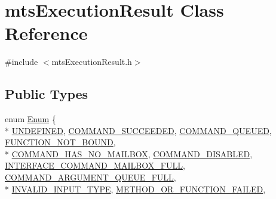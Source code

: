 \hypertarget{classmts_execution_result}{}\section{mts\+Execution\+Result Class Reference}
\label{classmts_execution_result}


{\ttfamily \#include $<$mts\+Execution\+Result.\+h$>$}

\subsection*{Public Types}
\begin{DoxyCompactItemize}
\item 
enum \hyperlink{classmts_execution_result_a10c4246c82ac99d88e5f716f79407b77}{Enum} \{ \\*
\hyperlink{classmts_execution_result_a10c4246c82ac99d88e5f716f79407b77a183bab612ecf53030df4ff80a3b8af9b}{U\+N\+D\+E\+F\+I\+N\+E\+D}, 
\hyperlink{classmts_execution_result_a10c4246c82ac99d88e5f716f79407b77aced9d158769e7ef0f2f17ef840a5e44a}{C\+O\+M\+M\+A\+N\+D\+\_\+\+S\+U\+C\+C\+E\+E\+D\+E\+D}, 
\hyperlink{classmts_execution_result_a10c4246c82ac99d88e5f716f79407b77a0e4d6149853440cbcaaa65391fe3dc69}{C\+O\+M\+M\+A\+N\+D\+\_\+\+Q\+U\+E\+U\+E\+D}, 
\hyperlink{classmts_execution_result_a10c4246c82ac99d88e5f716f79407b77aae1438c8267646451b13a5568996d4c4}{F\+U\+N\+C\+T\+I\+O\+N\+\_\+\+N\+O\+T\+\_\+\+B\+O\+U\+N\+D}, 
\\*
\hyperlink{classmts_execution_result_a10c4246c82ac99d88e5f716f79407b77a79a24cdbfea1eda7d4cf9553596d50f7}{C\+O\+M\+M\+A\+N\+D\+\_\+\+H\+A\+S\+\_\+\+N\+O\+\_\+\+M\+A\+I\+L\+B\+O\+X}, 
\hyperlink{classmts_execution_result_a10c4246c82ac99d88e5f716f79407b77ae2ff22d330a4e0a41cd55be7dda1fc43}{C\+O\+M\+M\+A\+N\+D\+\_\+\+D\+I\+S\+A\+B\+L\+E\+D}, 
\hyperlink{classmts_execution_result_a10c4246c82ac99d88e5f716f79407b77af7073c80d884d8ecaf97df0413f5478e}{I\+N\+T\+E\+R\+F\+A\+C\+E\+\_\+\+C\+O\+M\+M\+A\+N\+D\+\_\+\+M\+A\+I\+L\+B\+O\+X\+\_\+\+F\+U\+L\+L}, 
\hyperlink{classmts_execution_result_a10c4246c82ac99d88e5f716f79407b77abe17446a118a2b26b3d80968f97b8f94}{C\+O\+M\+M\+A\+N\+D\+\_\+\+A\+R\+G\+U\+M\+E\+N\+T\+\_\+\+Q\+U\+E\+U\+E\+\_\+\+F\+U\+L\+L}, 
\\*
\hyperlink{classmts_execution_result_a10c4246c82ac99d88e5f716f79407b77ac6601646fdfa18f7069e95d8605291e0}{I\+N\+V\+A\+L\+I\+D\+\_\+\+I\+N\+P\+U\+T\+\_\+\+T\+Y\+P\+E}, 
\hyperlink{classmts_execution_result_a10c4246c82ac99d88e5f716f79407b77a720d247dc08ce1bc06edf1a021bcbb1e}{M\+E\+T\+H\+O\+D\+\_\+\+O\+R\+\_\+\+F\+U\+N\+C\+T\+I\+O\+N\+\_\+\+F\+A\+I\+L\+E\+D}, 

\end{DoxyCompactItemize}
